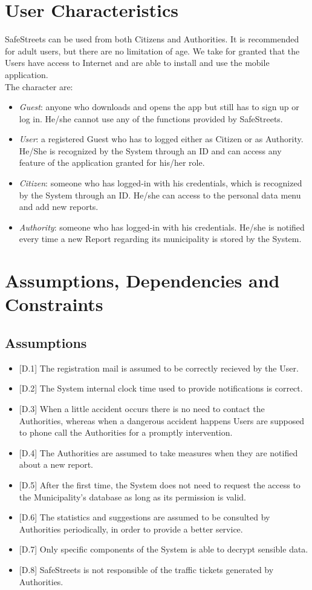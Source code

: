 \documentclass{report}
\begin{document}
\section{User Characteristics}
SafeStreets can be used from both Citizens and Authorities. It is recommended for adult users, but there are no limitation of age. 
We take for granted that the Users have access to Internet and are able to install and use the mobile application.\\
The character are:
\begin{itemize}
	\item \textit{Guest}: anyone who downloads and opens the app but still has to sign
	up or log in. He/she cannot use any of the functions provided by SafeStreets.
	\item \textit{User}: a registered Guest who has to logged either as Citizen or as Authority. He/She is recognized by the System through an ID and can access any feature of the application granted for his/her role.
	\item \textit{Citizen}: someone who has logged-in with his credentials, which is recognized by the System through an ID. He/she can access to the personal data menu and add new reports.
	\item \textit{Authority}: someone who has logged-in with his credentials. He/she is notified every time a new Report regarding its municipality is stored by the System.
\end{itemize}

\section{Assumptions, Dependencies and Constraints}
\subsection{Assumptions}
\begin{itemize}
	\item {[D.1]} The registration mail is assumed to be correctly recieved by the User.
	\item {[D.2]} The System internal clock time used to provide notifications is correct.
	\item {[D.3]} When a little accident occurs there is no need to contact the Authorities, whereas when a dangerous accident happens Users are supposed to phone call the Authorities for a promptly intervention.
	\item {[D.4]} The Authorities are assumed to  take measures when they are notified about a new report.
	\item {[D.5]} After the first time, the System does not need to request the access to the Municipality's database as long as its permission is valid.
	\item {[D.6]} The statistics and suggestions are assumed to be consulted by Authorities periodically, in order to provide a better service.
	\item {[D.7]} Only specific components of the System is able to decrypt sensible data.
	\item {[D.8]} SafeStreets is not responsible of the traffic tickets generated by Authorities.
\end{itemize}
\end{document}
